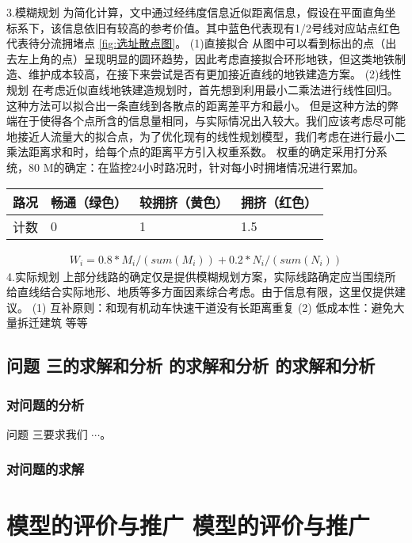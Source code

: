 \documentclass[12pt,a4paper]{mcmthesis}
\begin{document}
3.模糊规划
为简化计算，文中通过经纬度信息近似距离信息，假设在平面直角坐标系下，该信息依旧有较高的参考价值。其中蓝色代表现有1/2号线对应站点红色代表待分流拥堵点 \ref{fig:选址散点图}。
(1)直接拟合
从图中可以看到标出的点（出去左上角的点）呈现明显的圆环趋势，因此考虑直接拟合环形地铁，但这类地铁制造、维护成本较高，在接下来尝试是否有更加接近直线的地铁建造方案。
(2)线性规划
在考虑近似直线地铁建造规划时，首先想到利用最小二乘法进行线性回归。这种方法可以拟合出一条直线到各散点的距离差平方和最小。
但是这种方法的弊端在于使得各个点所含的信息量相同，与实际情况出入较大。我们应该考虑尽可能地接近人流量大的拟合点，为了优化现有的线性规划模型，我们考虑在进行最小二乘法距离求和时，给每个点的距离平方引入权重系数。
权重的确定采用打分系统，80%
M的确定：在监控24小时路况时，针对每小时拥堵情况进行累加。
\begin{table}
	\centering
	\begin{tabular}{|l|l|l|l|}
		\hline
		路况 & 畅通（绿色） & 较拥挤（黄色） & 拥挤（红色） \\ \hline
		计数 & 0 & 1 & 1.5 \\ \hline
	\end{tabular}
\end{table}
\begin{equation}
	\begin{aligned}
		W_i=0.8*M_i/(sum(M_i))+0.2*N_i/(sum(N_i))
	\end{aligned}
\end{equation}
4.实际规划
上部分线路的确定仅是提供模糊规划方案，实际线路确定应当围绕所给直线结合实际地形、地质等多方面因素综合考虑。由于信息有限，这里仅提供建议。
(1)	互补原则：和现有机动车快速干道没有长距离重复
(2)	低成本性：避免大量拆迁建筑
等等

\subsection{问题 三的求解和分析 的求解和分析 的求解和分析}

\subsubsection{对问题的分析}

问题 三要求我们 $\cdots$。

\subsubsection{对问题的求解}

\section{模型的评价与推广 模型的评价与推广}
\end{document}
